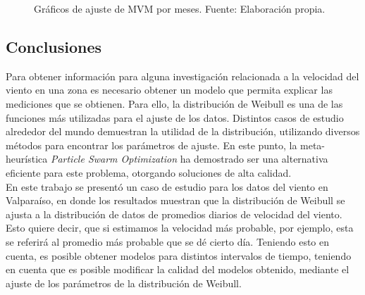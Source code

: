 \begin{figure}[ht!]
\begin{center}
{        }

    \end{center}
    \caption{Gráficos de ajuste de MVM por meses. Fuente: Elaboración propia.}
    \label{fig:PLOT_MONTHS}
\end{figure}

\pagebreak
\subsection{Conclusiones}
Para obtener información para alguna investigación relacionada a la velocidad del viento en una zona es necesario obtener un modelo que permita explicar las mediciones que se obtienen. Para ello, la distribución de Weibull es una de las funciones más utilizadas para el ajuste de los datos.
Distintos casos de estudio alrededor del mundo demuestran la utilidad de la distribución, utilizando diversos métodos para encontrar los parámetros de ajuste.
En este punto, la meta-heurística \emph{Particle Swarm Optimization} ha demostrado ser una alternativa eficiente para este problema, otorgando soluciones 
de alta calidad.\\
En este trabajo se presentó un caso de estudio para los datos del viento en Valparaíso, en donde los resultados muestran que la distribución de Weibull
se ajusta a la distribución de datos de promedios diarios de velocidad del viento. Esto quiere decir, que si estimamos la velocidad más probable, por ejemplo, 
esta se referirá al promedio más probable que se dé cierto día. Teniendo esto en cuenta, es posible obtener modelos para distintos intervalos de tiempo,
teniendo en cuenta que es posible modificar la calidad del modelos obtenido, mediante el ajuste de los parámetros de la distribución de Weibull.